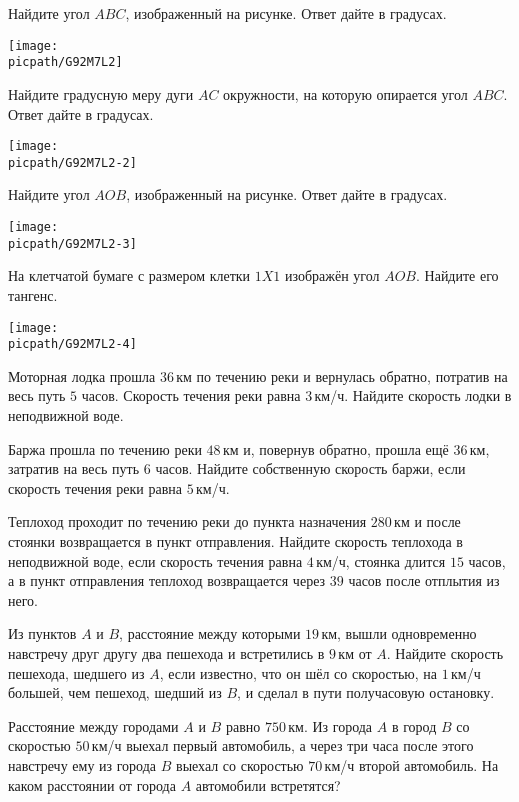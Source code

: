 \begin{class}[number=3]
	\begin{listofex}
		\item Найдите угол \( ABC \), изображенный на рисунке. Ответ дайте в градусах.
		\begin{center}
			\texttt{[image: \\picpath/G92M7L2]}
		\end{center}
		\item Найдите градусную меру дуги \( AC \) окружности, на которую опирается угол \( ABC \). Ответ
		дайте в градусах.
		\begin{center}
			\texttt{[image: \\picpath/G92M7L2-2]}
		\end{center}
		\item Найдите угол \( AOB \), изображенный на рисунке. Ответ дайте в градусах.
		\begin{center}
			\texttt{[image: \\picpath/G92M7L2-3]}
		\end{center}
		\item На клетчатой бумаге с размером клетки \( 1X1 \) изображён угол \( AOB \). Найдите его тангенс.
		\begin{center}
			\texttt{[image: \\picpath/G92M7L2-4]}
		\end{center}
		\item Моторная лодка прошла \( 36 \) км по течению реки и вернулась обратно, потратив на весь путь \( 5 \) часов. Скорость течения реки равна \( 3 \) км/ч. Найдите скорость лодки в неподвижной воде.
		\item Баржа прошла по течению реки \( 48 \) км и, повернув обратно, прошла ещё \( 36 \) км, затратив на весь путь \( 6 \) часов. Найдите собственную скорость баржи, если скорость течения реки равна \( 5 \) км/ч.
		\item Теплоход проходит по течению реки до пункта назначения \( 280 \) км и после стоянки возвращается в пункт отправления. Найдите скорость теплохода в неподвижной воде, если скорость течения равна \( 4 \) км/ч, стоянка длится \( 15 \) часов, а в пункт отправления теплоход возвращается через \( 39 \) часов после отплытия из него.
		\item Из пунктов \( A \) и \( B \), расстояние между которыми \( 19 \) км, вышли одновременно навстречу друг другу два пешехода и встретились в \( 9 \) км от \( A \). Найдите скорость пешехода, шедшего из \( A \), если известно, что он шёл со скоростью, на \( 1 \) км/ч большей, чем пешеход, шедший из \( B \), и сделал в пути получасовую остановку.
		\item Расстояние между городами \( A \) и \( B \) равно \( 750 \) км. Из города \( A \) в город \( B \) со скоростью \( 50 \) км/ч выехал первый автомобиль, а через три часа после этого навстречу ему из города \( B \) выехал со скоростью \( 70 \) км/ч второй автомобиль. На каком расстоянии от города \( A \) автомобили встретятся?
	\end{listofex}
\end{class}


